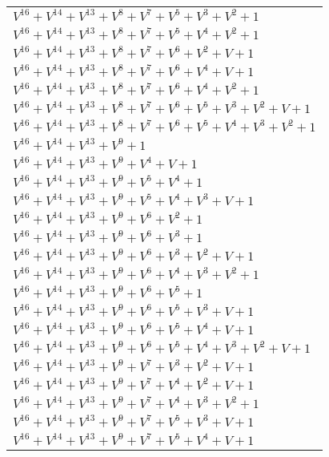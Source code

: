 \documentclass[12pt]{article}
\begin{document}
\begin{adjustwidth}{-4cm}{}
\begin{center}
\begin{longtable}{|l|}
$V^{16}  +V^{14}  +V^{13}  +V^{8}  +V^{7}  +V^{5}  +V^{3}  +V^{2}  + 1$ \\
$V^{16}  +V^{14}  +V^{13}  +V^{8}  +V^{7}  +V^{5}  +V^{4}  +V^{2}  + 1$ \\
$V^{16}  +V^{14}  +V^{13}  +V^{8}  +V^{7}  +V^{6}  +V^{2}  + V + 1$ \\
$V^{16}  +V^{14}  +V^{13}  +V^{8}  +V^{7}  +V^{6}  +V^{4}  + V + 1$ \\
$V^{16}  +V^{14}  +V^{13}  +V^{8}  +V^{7}  +V^{6}  +V^{4}  +V^{2}  + 1$ \\
$V^{16}  +V^{14}  +V^{13}  +V^{8}  +V^{7}  +V^{6}  +V^{5}  +V^{3}  +V^{2}  + V + 1$ \\
$V^{16}  +V^{14}  +V^{13}  +V^{8}  +V^{7}  +V^{6}  +V^{5}  +V^{4}  +V^{3}  +V^{2}  + 1$ \\
$V^{16}  +V^{14}  +V^{13}  +V^{9}  + 1$ \\
$V^{16}  +V^{14}  +V^{13}  +V^{9}  +V^{4}  + V + 1$ \\
$V^{16}  +V^{14}  +V^{13}  +V^{9}  +V^{5}  +V^{4}  + 1$ \\
$V^{16}  +V^{14}  +V^{13}  +V^{9}  +V^{5}  +V^{4}  +V^{3}  + V + 1$ \\
$V^{16}  +V^{14}  +V^{13}  +V^{9}  +V^{6}  +V^{2}  + 1$ \\
$V^{16}  +V^{14}  +V^{13}  +V^{9}  +V^{6}  +V^{3}  + 1$ \\
$V^{16}  +V^{14}  +V^{13}  +V^{9}  +V^{6}  +V^{3}  +V^{2}  + V + 1$ \\
$V^{16}  +V^{14}  +V^{13}  +V^{9}  +V^{6}  +V^{4}  +V^{3}  +V^{2}  + 1$ \\
$V^{16}  +V^{14}  +V^{13}  +V^{9}  +V^{6}  +V^{5}  + 1$ \\
$V^{16}  +V^{14}  +V^{13}  +V^{9}  +V^{6}  +V^{5}  +V^{3}  + V + 1$ \\
$V^{16}  +V^{14}  +V^{13}  +V^{9}  +V^{6}  +V^{5}  +V^{4}  + V + 1$ \\
$V^{16}  +V^{14}  +V^{13}  +V^{9}  +V^{6}  +V^{5}  +V^{4}  +V^{3}  +V^{2}  + V + 1$ \\
$V^{16}  +V^{14}  +V^{13}  +V^{9}  +V^{7}  +V^{3}  +V^{2}  + V + 1$ \\
$V^{16}  +V^{14}  +V^{13}  +V^{9}  +V^{7}  +V^{4}  +V^{2}  + V + 1$ \\
$V^{16}  +V^{14}  +V^{13}  +V^{9}  +V^{7}  +V^{4}  +V^{3}  +V^{2}  + 1$ \\
$V^{16}  +V^{14}  +V^{13}  +V^{9}  +V^{7}  +V^{5}  +V^{3}  + V + 1$ \\
$V^{16}  +V^{14}  +V^{13}  +V^{9}  +V^{7}  +V^{5}  +V^{4}  + V + 1$ \\

\end{longtable}
\end{center}
\end{adjustwidth}
\end{document}
